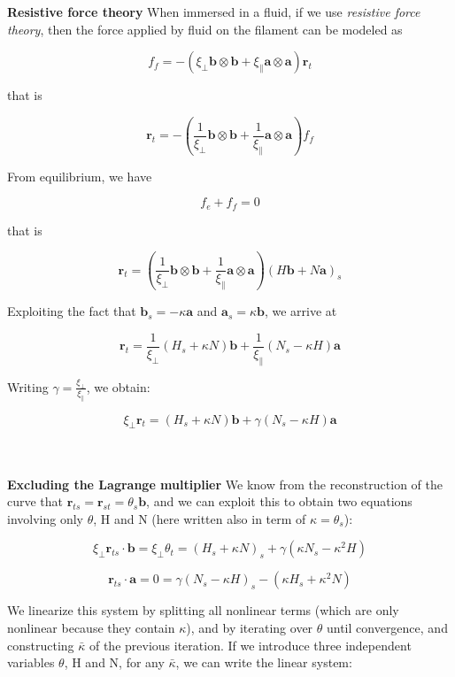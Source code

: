 \textbf{Resistive force theory}
When immersed in a fluid, if we use \emph{resistive force theory},
then the force applied by fluid on the filament can be modeled as

\[f_f = -( \xi_\perp \mathbf{b}\otimes \mathbf{b} +\xi_\parallel \mathbf{a}\otimes \mathbf{a}) \mathbf{r}_t\]

that is

\[\mathbf{r}_t = -\left( \frac{1}{\xi_\perp}  \mathbf{b}\otimes \mathbf{b} + \frac{1}{\xi_\parallel} \mathbf{a}\otimes \mathbf{a}\right) f_f\]

From equilibrium, we have

\[f_e+f_f = 0\]

that is

\[\mathbf{r}_t = \left( \frac{1}{\xi_\perp}  
\mathbf{b}\otimes \mathbf{b}  + \frac{1}{\xi_\parallel} \mathbf{a}\otimes \mathbf{a}\right) (H\mathbf{b} + N \mathbf{a})_s\]

Exploiting the fact that \(\mathbf{b}_s = - \kappa \mathbf{a}\) and \(\mathbf{a}_s = \kappa \mathbf{b}\), we
arrive at

\[\mathbf{r}_t =  \frac{1}{\xi_\perp} (H_s + \kappa N) \mathbf{b} + \frac{1}{\xi_\parallel}(N_s - \kappa H) \mathbf{a}\]

Writing $\gamma = \frac{\xi_\perp}{\xi_\parallel}$, we obtain:

\[\xi_\perp \mathbf{r}_t =   (H_s + \kappa N) \mathbf{b} + \gamma (N_s - \kappa H) \mathbf{a}\]

\\\\
\textbf{Excluding the Lagrange multiplier}
We know from the reconstruction of the curve that
\(\mathbf{r}_{ts} = \mathbf{r}_{st} = \theta_s \mathbf{b}\),
and we can exploit this to obtain two equations involving only
\(\theta\),
H
and N (here written also in term of $\kappa = \theta_s$):

\[ \xi_\perp \mathbf{r}_{ts}\cdot \mathbf{b} =\xi_\perp \theta_t =   (H_s + \kappa N)_s + \gamma (\kappa N_s - \kappa^2 H)\]

\[\mathbf{r}_{ts}\cdot \mathbf{a} = 0 =  \gamma(N_s - \kappa H)_s - (\kappa H_s + \kappa^2 N) \]

We linearize this system by splitting all nonlinear terms (which are
only nonlinear because they contain \(\kappa\)), and by iterating over
\(\theta\) until convergence, and constructing \(\bar\kappa\) of the
previous iteration. If we introduce three independent variables
\(\theta\), H and N, for any \(\bar\kappa\), we can write
the linear system:

